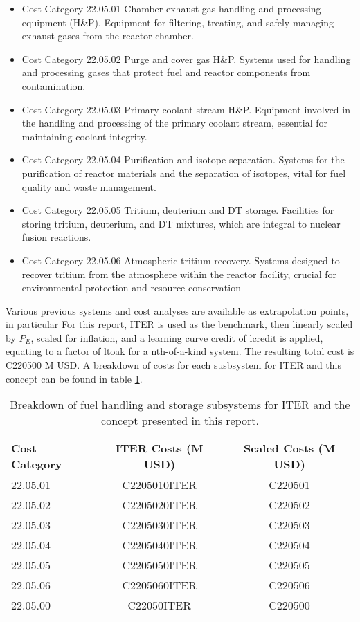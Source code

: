 \begin{itemize}
    \item Cost Category 22.05.01 Chamber exhaust gas handling and processing equipment (H\&P).  Equipment for filtering, treating, and safely managing exhaust gases from the reactor chamber.
    \item Cost Category 22.05.02 Purge and cover gas H\&P. Systems used for handling and processing gases that protect fuel and reactor components from contamination.
    \item Cost Category 22.05.03 Primary coolant stream H\&P. Equipment involved in the handling and processing of the primary coolant stream, essential for maintaining coolant integrity.
    \item Cost Category 22.05.04 Purification and isotope separation. Systems for the purification of reactor materials and the separation of isotopes, vital for fuel quality and waste management.
    \item Cost Category 22.05.05 Tritium, deuterium and DT storage. Facilities for storing tritium, deuterium, and DT mixtures, which are integral to nuclear fusion reactions.
    \item Cost Category 22.05.06 Atmospheric tritium recovery. Systems designed to recover tritium from the atmosphere within the reactor facility, crucial for environmental protection and resource conservation
\end{itemize}

Various previous systems and cost analyses are available as extrapolation points, in particular For this report, ITER is used as the benchmark, then linearly scaled by $P_E$, scaled for inflation, and a learning curve credit of lcredit is applied, equating to a factor of ltoak for a nth-of-a-kind system.  The resulting total cost is C220500 M USD. A breakdown of costs for each susbsystem for ITER and this concept can be found in table \ref{tab:fuel}.



\begin{table}
    \centering
    \begin{tabular}{lcc}
        \hline
        Cost Category & ITER Costs (M USD) & Scaled Costs (M USD)\\
        \hline
        22.05.01  & C2205010ITER & C220501\\
        22.05.02  & C2205020ITER & C220502\\
        22.05.03  & C2205030ITER & C220503\\
        22.05.04  & C2205040ITER & C220504\\
        22.05.05  & C2205050ITER & C220505\\
        22.05.06  & C2205060ITER & C220506\\
        22.05.00  & C22050ITER   & C220500\\
        \hline
    \end{tabular}
    \caption{Breakdown of fuel handling and storage subsystems for ITER and the concept presented in this report.}
    \label{tab:fuel}
\end{table}
